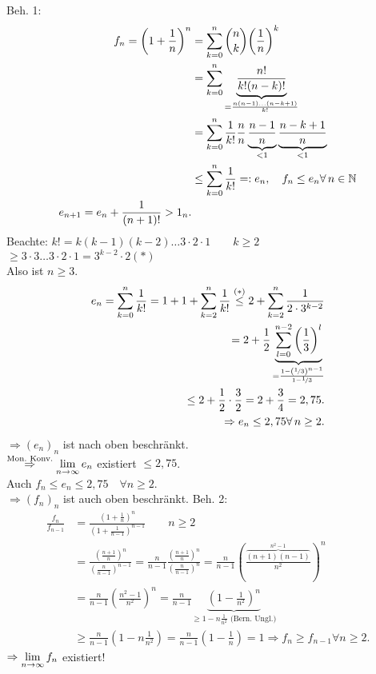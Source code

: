 \documentclass[../ana1.tex]{subfiles}
\begin{document}
\begin{bew}
	Beh. 1:
	\begin{align*}
		f_n = {\left(1+\frac{1}{n}\right)}^n  &= \sum_{k=0}^{n} \binom{n}{k} {\left( \frac{1}{n} \right)}^k\\
		&= \sum_{k=0}^{n} \underbrace{\frac{n!}{k!(n-k)!}}_{=\frac{n(n-1)\ldots (n-k+1)}{k!}} \\
		&= \sum_{k=0}^{n} \frac{1}{k!} \frac{n}{n} \underbrace{\frac{n-1}{n}}_{<1} \underbrace{\frac{n-k+1}{n}}_{<1}\\
		&\leq \sum_{k=0}^{n} \frac{1}{k!} =: e_n, \quad f_n \leq e_n \forall n\in\N \\
		e_{n+1} = e_n + \frac{1}{(n+1)!} > 1_n.
	\end{align*}
	Beachte: \( k! = k(k-1)(k-2)\ldots3\cdot2\cdot1 \qquad k\geq 2 \) \\
	\( \geq 3\cdot3\ldots3\cdot2\cdot1 = 3^{k-2}\cdot2 (*) \) \\
	Also ist \(n\geq3\).
	\begin{align*}
		e_n = \sum_{k=0}^{n} \frac{1}{k!} = 1+1 + \sum_{k=2}^{n} \frac{1}{k!} \overset{(*)}{\leq} 2 + \sum_{k=2}^{n} \frac{1}{2 \cdot 3^{k-2}}\\
		= 2 + \frac{1}{2} \underbrace{\sum_{l=0}^{n-2} 
		{\left(\frac{1}{3}\right)}^l}_{
			=\ensuremath{ \frac{1 
			- {\left( \nicefrac{1}{3} \right)}^{n-1} } }
			{1 - \nicefrac{1}{3}}}\\
		\leq 2 + \frac{1}{2} \cdot \frac{3}{2} 
		= 2 + \frac{3}{4} = 2,75.\\
		\Rightarrow e_n \leq 2,75 \forall n\geq 2.
	\end{align*}
	\(\Rightarrow {(e_n)}_n \) ist nach oben beschränkt.\\
	\( \overset{\text{Mon.\ Konv.}}{\Rightarrow} \lim\limits_{n\rightarrow\infty} e_n \) existiert \(\leq 2,75\).\\
	Auch \( f_n\leq e_n\leq 2,75 \quad \forall n\geq 2 \).\\
	\( \Rightarrow {(f_n)}_n \) ist auch oben beschränkt.
	Beh. 2:\\
	\begin{align*}
		\frac{f_n}{f_{n-1}} &= \frac{{(1+\frac{1}{n})}^n}{{(1+\frac{1}{n-1})}^{n-1}} \qquad n\geq 2\\
		&= \frac{{(\frac{n+1}{n})}^n}{{(\frac{n}{n-1})}^{n-1}} = \frac{n}{n-1} \frac{{(\frac{n+1}{n})}^n}{{(\frac{n}{n-1})}^{n}} = \frac{n}{n-1} {\left( \frac{\overbrace{(n+1)(n-1)}^{n^2-1}}{n^2} \right)}^n\\
		&= \frac{n}{n-1} {\left( \frac{n^2-1}{n^2} \right)}^n 
		= \frac{n}{n-1} \underbrace{{\left( 1-\frac{1}{n^2} \right)}^n}_{
			\geq 1-n \frac{1}{n^2} \text{ (Bern. Ungl.)}}\\
		&\geq \frac{n}{n-1} \left(1-n \frac{1}{n^2} \right) 
		= \frac{n}{n-1} \left( 1-\frac{1}{n} \right) 
		= 1 \Rightarrow f_n \geq f_{n-1} \forall n\geq 2.
	\end{align*}
	\( \Rightarrow \lim\limits_{n\rightarrow\infty} f_n \) existiert!
\end{bew}
\end{document}
